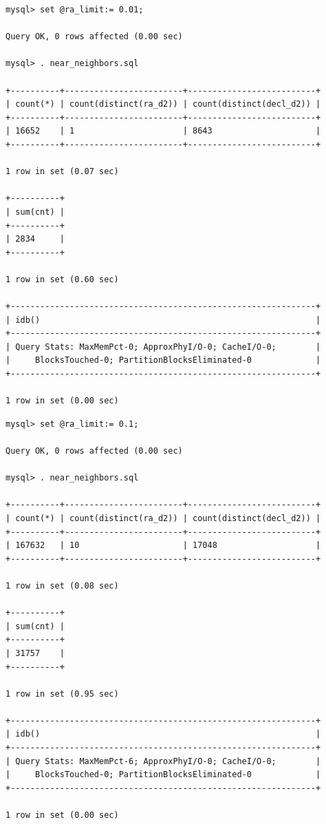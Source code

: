 \documentclass[DM,lsstdraft,toc]{lsstdoc}
\begin{document}
\begin{verbatim}
mysql> set @ra_limit:= 0.01;

Query OK, 0 rows affected (0.00 sec)

mysql> . near_neighbors.sql

+----------+------------------------+--------------------------+
| count(*) | count(distinct(ra_d2)) | count(distinct(decl_d2)) |
+----------+------------------------+--------------------------+
| 16652    | 1                      | 8643                     |
+----------+------------------------+--------------------------+

1 row in set (0.07 sec)

+----------+
| sum(cnt) |
+----------+
| 2834     |
+----------+

1 row in set (0.60 sec)

+--------------------------------------------------------------+
| idb()                                                        |
+--------------------------------------------------------------+
| Query Stats: MaxMemPct-0; ApproxPhyI/O-0; CacheI/O-0;        |
|     BlocksTouched-0; PartitionBlocksEliminated-0             |
+--------------------------------------------------------------+

1 row in set (0.00 sec)
\end{verbatim}

\begin{verbatim}
mysql> set @ra_limit:= 0.1;

Query OK, 0 rows affected (0.00 sec)

mysql> . near_neighbors.sql

+----------+------------------------+--------------------------+
| count(*) | count(distinct(ra_d2)) | count(distinct(decl_d2)) |
+----------+------------------------+--------------------------+
| 167632   | 10                     | 17048                    |
+----------+------------------------+--------------------------+

1 row in set (0.08 sec)

+----------+
| sum(cnt) |
+----------+
| 31757    |
+----------+

1 row in set (0.95 sec)

+--------------------------------------------------------------+
| idb()                                                        |
+--------------------------------------------------------------+
| Query Stats: MaxMemPct-6; ApproxPhyI/O-0; CacheI/O-0;        |
|     BlocksTouched-0; PartitionBlocksEliminated-0             |
+--------------------------------------------------------------+

1 row in set (0.00 sec)
\end{verbatim}
\end{document}
